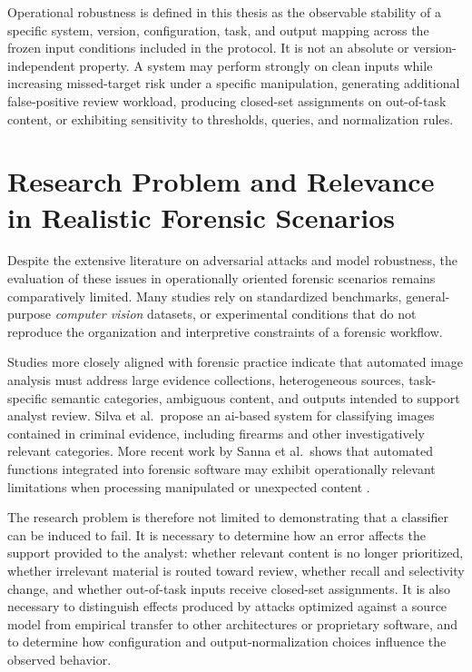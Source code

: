 Operational robustness is defined in this thesis as the observable stability of
a specific system, version, configuration, task, and output mapping across the
frozen input conditions included in the protocol. It is not an absolute or
version-independent property. A system may perform strongly on clean inputs
while increasing missed-target risk under a specific manipulation, generating
additional false-positive review workload, producing closed-set assignments on
out-of-task content, or exhibiting sensitivity to thresholds, queries, and
normalization rules.

\section{Research Problem and Relevance in Realistic Forensic Scenarios}

Despite the extensive literature on adversarial attacks and model robustness,
the evaluation of these issues in operationally oriented forensic scenarios
remains comparatively limited. Many studies rely on standardized benchmarks,
general-purpose \textit{computer vision} datasets, or experimental conditions
that do not reproduce the organization and interpretive constraints of a
forensic workflow.

Studies more closely aligned with forensic practice indicate that automated
image analysis must address large evidence collections, heterogeneous sources,
task-specific semantic categories, ambiguous content, and outputs intended to
support analyst review. Silva et al.\ propose an \gls{ai}-based system for
classifying images contained in criminal evidence, including firearms and other
investigatively relevant categories. More recent work by Sanna et al.\ shows
that automated functions integrated into forensic software may exhibit
operationally relevant limitations when processing manipulated or unexpected
content
\cite{silva2021microservices,sanna2024preliminary,sanna2025pixelperfect}.

The research problem is therefore not limited to demonstrating that a
classifier can be induced to fail. It is necessary to determine how an error
affects the support provided to the analyst: whether relevant content is no
longer prioritized, whether irrelevant material is routed toward review,
whether recall and selectivity change, and whether out-of-task inputs receive
closed-set assignments. It is also necessary to distinguish effects produced by
attacks optimized against a source model from empirical transfer to other
architectures or proprietary software, and to determine how configuration and
output-normalization choices influence the observed behavior.

